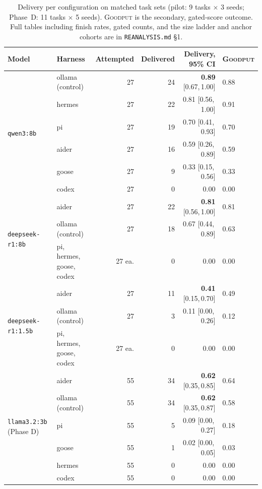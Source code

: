 \documentclass[10pt]{article}
\newcommand{\goodput}{\textsc{Goodput}}
\newcommand{\ci}[2]{[#1,\,#2]}
\begin{document}
\begin{table}[t]
\centering\small
\begin{tabular}{llrrrl}
\toprule
Model & Harness & Attempted & Delivered & Delivery, 95\% CI & \goodput{}\\
\midrule
\multirow{6}{*}{\texttt{qwen3:8b}}
 & ollama (control) & 27 & 24 & \textbf{0.89} \ci{0.67}{1.00} & 0.88\\
 & hermes & 27 & 22 & 0.81 \ci{0.56}{1.00} & 0.91\\
 & pi & 27 & 19 & 0.70 \ci{0.41}{0.93} & 0.70\\
 & aider & 27 & 16 & 0.59 \ci{0.26}{0.89} & 0.59\\
 & goose & 27 & 9 & 0.33 \ci{0.15}{0.56} & 0.33\\
 & codex & 27 & 0 & 0.00 & 0.00\\
\midrule
\multirow{3}{*}{\texttt{deepseek-r1:8b}}
 & aider & 27 & 22 & \textbf{0.81} \ci{0.56}{1.00} & 0.81\\
 & ollama (control) & 27 & 18 & 0.67 \ci{0.44}{0.89} & 0.63\\
 & pi, hermes, goose, codex & 27 ea. & 0 & 0.00 & 0.00\\
\midrule
\multirow{3}{*}{\texttt{deepseek-r1:1.5b}}
 & aider & 27 & 11 & \textbf{0.41} \ci{0.15}{0.70} & 0.49\\
 & ollama (control) & 27 & 3 & 0.11 \ci{0.00}{0.26} & 0.12\\
 & pi, hermes, goose, codex & 27 ea. & 0 & 0.00 & 0.00\\
\midrule
\multirow{6}{*}{\texttt{llama3.2:3b} (Phase D)}
 & aider & 55 & 34 & \textbf{0.62} \ci{0.35}{0.85} & 0.64\\
 & ollama (control) & 55 & 34 & \textbf{0.62} \ci{0.35}{0.87} & 0.58\\
 & pi & 55 & 5 & 0.09 \ci{0.00}{0.27} & 0.18\\
 & goose & 55 & 1 & 0.02 \ci{0.00}{0.05} & 0.03\\
 & hermes & 55 & 0 & 0.00 & 0.00\\
 & codex & 55 & 0 & 0.00 & 0.00\\
\bottomrule
\end{tabular}
\caption{Delivery per configuration on matched task sets (pilot: 9 tasks $\times$ 3 seeds; Phase~D:
11 tasks $\times$ 5 seeds). \goodput{} is the secondary, gated-score outcome. Full tables including
finish rates, gated counts, and the size ladder and anchor cohorts are in \texttt{REANALYSIS.md}
\S1.}
\label{tab:config}
\end{table}
\end{document}
